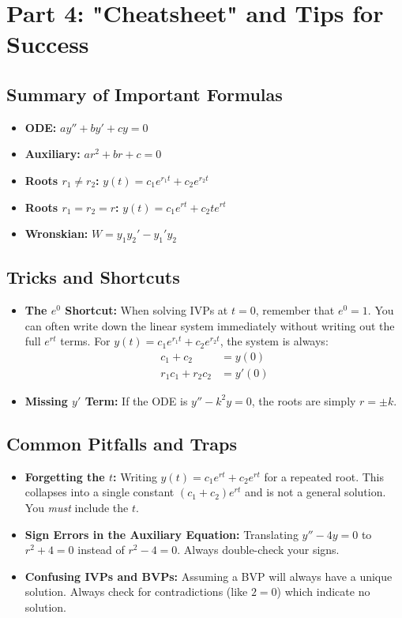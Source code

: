 \documentclass[12pt]{article}
\begin{document}
\newpage
\section{Part 4: "Cheatsheet" and Tips for Success}

\subsection{Summary of Important Formulas}
\begin{itemize}
    \item \textbf{ODE:} $a y'' + b y' + c y = 0$
    \item \textbf{Auxiliary:} $a r^2 + b r + c = 0$
    \item \textbf{Roots $r_1 \neq r_2$:} $y(t) = c_1 e^{r_1 t} + c_2 e^{r_2 t}$
    \item \textbf{Roots $r_1 = r_2 = r$:} $y(t) = c_1 e^{rt} + c_2 t e^{rt}$
    \item \textbf{Wronskian:} $W = y_1 y_2' - y_1' y_2$
\end{itemize}

\subsection{Tricks and Shortcuts}
\begin{itemize}
    \item \textbf{The $e^0$ Shortcut:} When solving IVPs at $t=0$, remember that $e^0 = 1$. You can often write down the linear system immediately without writing out the full $e^{rt}$ terms. For $y(t) = c_1 e^{r_1 t} + c_2 e^{r_2 t}$, the system is always:
    \begin{align*}
        c_1 + c_2 &= y(0) \\
        r_1 c_1 + r_2 c_2 &= y'(0)
    \end{align*}
    \item \textbf{Missing $y'$ Term:} If the ODE is $y'' - k^2 y = 0$, the roots are simply $r = \pm k$.
\end{itemize}

\subsection{Common Pitfalls and Traps}
\begin{itemize}
    \item \textbf{Forgetting the $t$:} Writing $y(t) = c_1 e^{rt} + c_2 e^{rt}$ for a repeated root. This collapses into a single constant $(c_1+c_2)e^{rt}$ and is not a general solution. You \textit{must} include the $t$.
    \item \textbf{Sign Errors in the Auxiliary Equation:} Translating $y'' - 4y = 0$ to $r^2 + 4 = 0$ instead of $r^2 - 4 = 0$. Always double-check your signs.
    \item \textbf{Confusing IVPs and BVPs:} Assuming a BVP will always have a unique solution. Always check for contradictions (like $2 = 0$) which indicate no solution.
\end{itemize}
\end{document}
